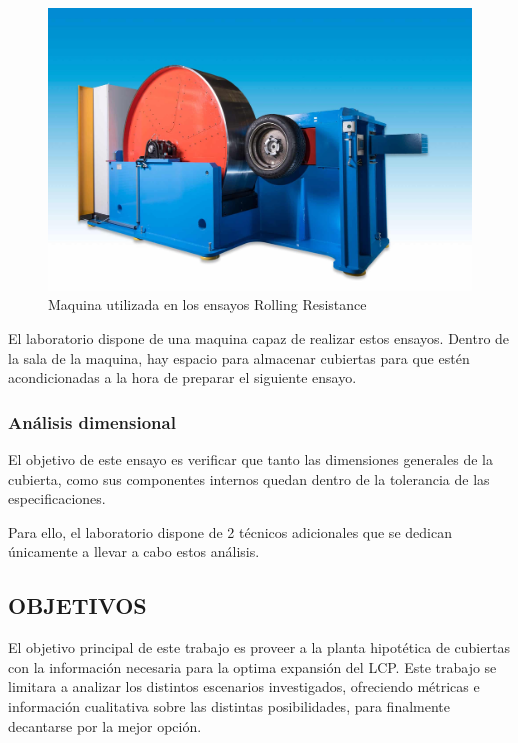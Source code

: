 \begin{figure}
	\begin{center}
		\includegraphics[width=\textwidth]{fig/2_rr_machine}
	\end{center}
	\caption{Maquina utilizada en los ensayos Rolling Resistance}
	\label{fig:2_rr_machine}
\end{figure}

El laboratorio dispone de una maquina capaz de realizar estos ensayos.
Dentro de la sala de la maquina, hay espacio para almacenar cubiertas
para que estén acondicionadas a la hora de preparar el siguiente ensayo.

\subsubsection{Análisis dimensional}
El objetivo de este ensayo es verificar que
tanto las dimensiones generales de la cubierta,
como sus componentes internos
quedan dentro de la tolerancia de las especificaciones.

Para ello, el laboratorio dispone de 2 técnicos adicionales
que se dedican únicamente a llevar a cabo estos análisis.


\subsection{OBJETIVOS}\label{sec_obj}
El objetivo principal de este trabajo
es proveer a la planta hipotética de cubiertas
con la información necesaria para la optima expansión del LCP.
Este trabajo se limitara a analizar los distintos escenarios investigados,
ofreciendo métricas e información cualitativa
sobre las distintas posibilidades,
para finalmente decantarse por la mejor opción.


